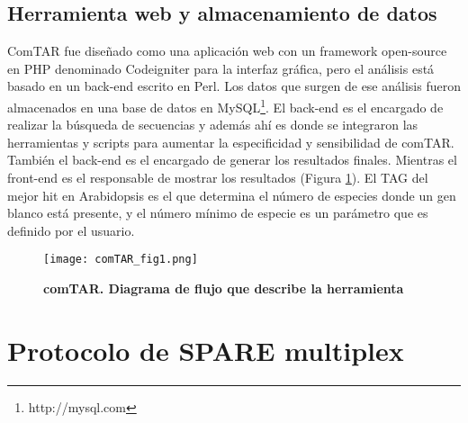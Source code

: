 \subsection{Herramienta web y almacenamiento de datos}
ComTAR fue diseñado como una aplicación web con un framework open-source en PHP denominado Codeigniter para la interfaz gráfica, pero el análisis está basado en un back-end escrito en Perl.
Los datos que surgen de ese análisis fueron almacenados en una base de datos en MySQL\footnote{http://mysql.com}.
El back-end es el encargado de realizar la búsqueda de secuencias y además ahí es donde se integraron las herramientas y scripts para aumentar la especificidad y sensibilidad de comTAR. 
También el back-end es el encargado de generar los resultados finales.
Mientras el front-end es el responsable de mostrar los resultados (Figura \ref{fig:comTAR_fig1}).
El TAG del mejor hit en Arabidopsis es el que determina el número de especies donde un gen blanco está presente, y el número mínimo de especie es un parámetro que es definido por el usuario.

\begin{figure}[htbp!] 
    \centering    
    \texttt{[image: comTAR\_fig1.png]}
    \caption[comTAR. Diagrama de flujo]{
    \textbf{comTAR. Diagrama de flujo que describe la herramienta}
    }
    \label{fig:comTAR_fig1}
\end{figure}


\section{Protocolo de SPARE multiplex}

